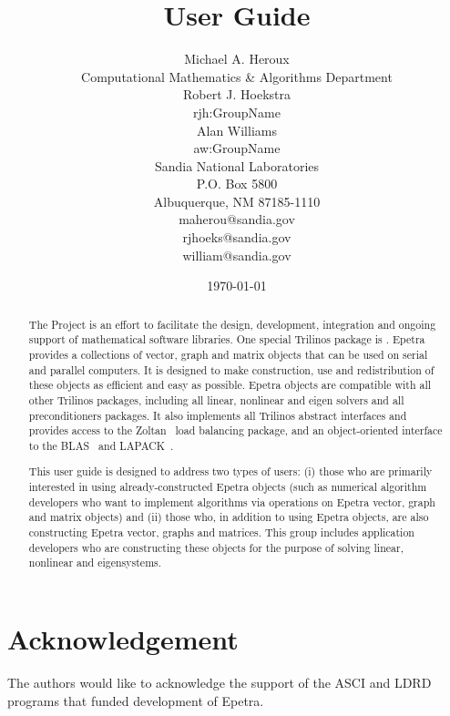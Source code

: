 \documentclass[12pt,relax]{EpetraUserGuide}
\title{\EpetraTM{} User Guide}
\author{Michael A. Heroux \\
      	  Computational Mathematics \& Algorithms Department \\
	    Robert J. Hoekstra\\
      	  rjh:GroupName \\
         Alan Williams \\
            aw:GroupName \\
	    Sandia National Laboratories\\
	    P.O. Box 5800\\
	    Albuquerque, NM 87185-1110 \\
	    maherou@sandia.gov \\
	    rjhoeks@sandia.gov \\
	    william@sandia.gov \\
	 }
\date{\today} %
\begin{document}
\maketitle

\begin{abstract}

The \TrilinosTM{} Project is an effort to facilitate the design, development,
integration and ongoing support of mathematical software libraries.
One special Trilinos package is \EpetraTM{}.  Epetra provides a collections of
vector, graph and matrix objects that can be used on serial
and parallel computers.  It is designed to make construction, use and redistribution
of these objects as efficient and easy as possible.  Epetra objects are compatible with all
other Trilinos packages, including all linear, nonlinear and eigen solvers and all
preconditioners packages.  It also implements all Trilinos abstract interfaces and 
provides access to the Zoltan~\cite{zoltan-ug} load balancing package, and an object-oriented
interface to the BLAS~\cite{BLAS1,BLAS2,BLAS3} and LAPACK~\cite{lapack}.


This user guide is designed to address two types of users: 
(i) those who
are primarily interested in using already-constructed Epetra objects (such as 
numerical algorithm developers who want to implement algorithms via 
operations on Epetra vector, graph and matrix objects) and 
(ii) those who, in addition to using Epetra
objects, are also constructing Epetra vector, graphs and matrices.  This group
includes application developers who are constructing these objects for the purpose
of solving linear, nonlinear and eigensystems.

\end{abstract}


\section*{Acknowledgement}
The authors would like to acknowledge the support of the ASCI and LDRD 
programs that funded development of Epetra.

\clearpage
\tableofcontents
\listoffigures
\listoftables

\clearpage
\end{document}
